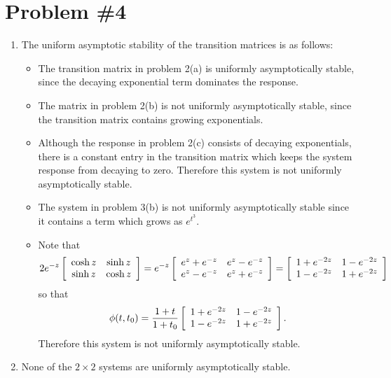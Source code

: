 \documentclass{article}
\begin{document}
\pagebreak

\section*{Problem \#4}

\begin{enumerate}
  \item{
    The uniform asymptotic stability of the transition matrices is as
    follows:
    \begin{itemize}
      \item{
        The transition matrix in problem 2(a) is uniformly
        asymptotically stable, since the decaying exponential term
        dominates the response.
      }
      \item{
        The matrix in problem 2(b) is not uniformly asymptotically
        stable, since the transition matrix contains growing
        exponentials.
      }
      \item{
        Although the response in problem 2(c) consists of decaying
        exponentials, there is a constant entry in the transition
        matrix which keeps the system response from decaying to
        zero. Therefore this system is not uniformly asymptotically
        stable.
      }
      \item{
        The system in problem 3(b) is not uniformly asymptotically
        stable since it contains a term which grows as $e^{t^3}$.
      }
      \item{
        Note that
        $$
        2e^{-z}
        \left[\begin{array}{c c}
          \cosh z & \sinh z \\
          \sinh z & \cosh z
        \end{array}\right]
        =
        e^{-z}
        \left[\begin{array}{c c}
          e^{z} + e^{-z} & e^{z} - e^{-z} \\
          e^{z} - e^{-z} & e^{z} + e^{-z}
        \end{array}\right]
        =
        \left[\begin{array}{c c}
          1 + e^{-2z} & 1 - e^{-2z} \\
          1 - e^{-2z} & 1 + e^{-2z}
        \end{array}\right]
        $$
        so that
        $$
        \phi(t, t_0) =
        \frac{1 + t}{1 + t_0}
        \left[\begin{array}{c c}
          1 + e^{-2z} & 1 - e^{-2z} \\
          1 - e^{-2z} & 1 + e^{-2z}
        \end{array}\right].
        $$
        Therefore this system is not uniformly asymptotically stable.
      }
    \end{itemize}
  }
  \item{
    None of the $2 \times 2$ systems are uniformly asymptotically stable.
  }
\end{enumerate}
\end{document}
